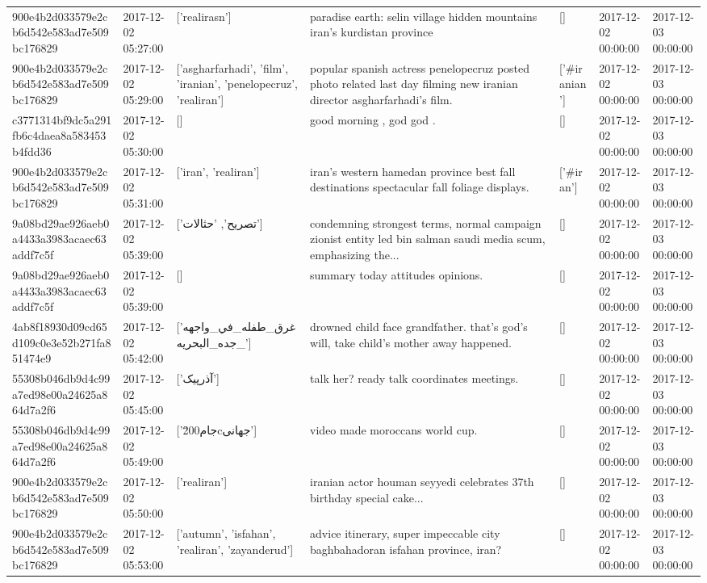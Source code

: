 \begin{tabular}{lllllll}
900e4b2d033579e2cb6d542e583ad7e509bc176829 & 2017-12-02 05:27:00 & ['realirasn'] & paradise earth: selin village hidden mountains iran's kurdistan province & [] & 2017-12-02 00:00:00 & 2017-12-03 00:00:00 \\
900e4b2d033579e2cb6d542e583ad7e509bc176829 & 2017-12-02 05:29:00 & ['asgharfarhadi', 'film', 'iranian', 'penelopecruz', 'realiran'] & popular spanish actress penelopecruz posted photo related last day filming new iranian director asgharfarhadi's film. & ['#iranian'] & 2017-12-02 00:00:00 & 2017-12-03 00:00:00 \\
c3771314bf9dc5a291fb6c4daea8a583453b4fdd36 & 2017-12-02 05:30:00 & [] & good morning , god god . & [] & 2017-12-02 00:00:00 & 2017-12-03 00:00:00 \\
900e4b2d033579e2cb6d542e583ad7e509bc176829 & 2017-12-02 05:31:00 & ['iran', 'realiran'] & iran's western hamedan province best fall destinations spectacular fall foliage displays. & ['#iran'] & 2017-12-02 00:00:00 & 2017-12-03 00:00:00 \\
9a08bd29ae926aeb0a4433a3983acaec63addf7c5f & 2017-12-02 05:39:00 & ['تصريح', 'حثالات'] & condemning strongest terms, normal campaign zionist entity led bin salman saudi media scum, emphasizing the... & [] & 2017-12-02 00:00:00 & 2017-12-03 00:00:00 \\
9a08bd29ae926aeb0a4433a3983acaec63addf7c5f & 2017-12-02 05:39:00 & [] & summary today attitudes opinions. & [] & 2017-12-02 00:00:00 & 2017-12-03 00:00:00 \\
4ab8f18930d09cd65d109c0e3e52b271fa851474e9 & 2017-12-02 05:42:00 & ['غرق_طفله_في_واجهه_جده_البحريه'] & drowned child face grandfather. that's god's will, take child's mother away happened. & [] & 2017-12-02 00:00:00 & 2017-12-03 00:00:00 \\
55308b046db9d4c99a7ed98e00a24625a864d7a2f6 & 2017-12-02 05:45:00 & ['آذرپیک'] & talk her? ready talk coordinates meetings. & [] & 2017-12-02 00:00:00 & 2017-12-03 00:00:00 \\
55308b046db9d4c99a7ed98e00a24625a864d7a2f6 & 2017-12-02 05:49:00 & ['جام\u200cجهانی'] & video made moroccans world cup. & [] & 2017-12-02 00:00:00 & 2017-12-03 00:00:00 \\
900e4b2d033579e2cb6d542e583ad7e509bc176829 & 2017-12-02 05:50:00 & ['realiran'] & iranian actor houman seyyedi celebrates 37th birthday special cake... & [] & 2017-12-02 00:00:00 & 2017-12-03 00:00:00 \\
900e4b2d033579e2cb6d542e583ad7e509bc176829 & 2017-12-02 05:53:00 & ['autumn', 'isfahan', 'realiran', 'zayanderud'] & advice itinerary, super impeccable city baghbahadoran isfahan province, iran? & [] & 2017-12-02 00:00:00 & 2017-12-03 00:00:00 \\

\end{tabular}
